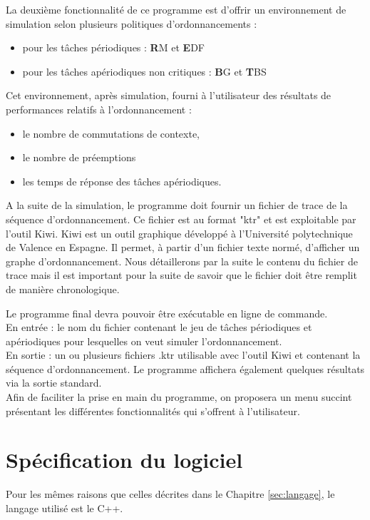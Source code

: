 	La deuxième fonctionnalité de ce programme est d'offrir un environnement de simulation selon plusieurs politiques d'ordonnancements :
	\begin{itemize}
		\item pour les tâches périodiques : \textbf RM et \textbf EDF
		\item pour les tâches apériodiques non critiques :  \textbf BG et \textbf TBS
	\end{itemize}
	Cet environnement, après simulation, fourni à l'utilisateur des résultats de performances relatifs à l'ordonnancement : 
	\begin{itemize}
		\item le nombre de commutations de contexte,
		\item le nombre de préemptions
		\item les temps de réponse des tâches apériodiques.
	\end{itemize}
	
	A la suite de la simulation, le programme doit fournir un fichier de trace de la séquence d'ordonnancement. Ce fichier est au format "ktr" et est exploitable par l'outil Kiwi. 
	Kiwi est un outil graphique développé à l'Université polytechnique de Valence en Espagne. Il permet, à partir d'un fichier texte normé, d'afficher un graphe d'ordonnancement. Nous détaillerons par la suite le contenu du fichier de trace mais il est important pour la suite de savoir que le fichier doit être remplit de manière chronologique.
		
	Le programme final devra pouvoir être exécutable en ligne de commande.\\
		
	En entrée : le nom du fichier contenant le jeu de tâches périodiques et apériodiques pour lesquelles on veut simuler l'ordonnancement.\\
		
	En sortie : un ou plusieurs fichiers .ktr utilisable avec l'outil Kiwi et contenant la séquence d'ordonnancement. Le programme affichera également quelques résultats via la sortie standard.\\
		
		Afin de faciliter la prise en main du programme, on proposera un menu succint présentant les différentes fonctionnalités qui s'offrent à l'utilisateur.
	
	\section{Spécification du logiciel}
		Pour les mêmes raisons que celles décrites dans le Chapitre \ref{sec:langage}, le langage utilisé est le C++.

